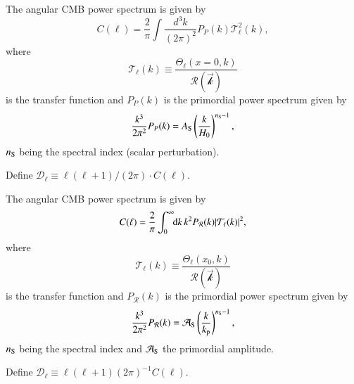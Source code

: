 

\please

The angular CMB power spectrum is given by
\begin{equation}
    C(\ell)= \frac{2}{\pi} \int \frac{d^3 k}{(2\pi)^2} P_P(k) \mathcal{T}_\ell^2 (k),
\end{equation}
where
\begin{equation}
    \mathcal{T}_\ell(k) \equiv \frac{\Theta_\ell(x\!=\!0, k)}{\mathcal{R(\vec{k})}}
\end{equation}
is the transfer function and $P_P(k)$ is the primordial power spectrum given by
\begin{equation}
    \frac{k^3}{2\pi^2} P_P (k) = A_\mathrm{S}\left( \frac{k}{H_0}\right)^{n_\mathrm{S}-1},
\end{equation}
$n_\mathrm{S}$ being the spectral index (scalar perturbation).


Define $\mathcal{D}_\ell \equiv \ell (\ell+1)/(2\pi) \cdot C(\ell) $.

\sendhelp

\please

The angular CMB power spectrum is given by
\begin{equation}
    C(\ell)= \frac{2}{\pi} \int_0^\infty \!\!\mathop{}\!\mathrm{d} {k}\, k^2 P_\mathcal{R}(k) \abs{\mathcal{T}_\ell (k)}^2,
\end{equation}
where
\begin{equation}
    \mathcal{T}_\ell(k) \equiv \frac{\Theta_\ell(x_0, k)}{\mathcal{R(\vec{k})}}
\end{equation}
is the transfer function and $P_\mathcal{R}(k)$ is the primordial power spectrum given by
\begin{equation}
    \frac{k^3}{2\pi^2} P_\mathcal{R} (k) = \mathcal{A}_\mathrm{S}\left( \frac{k}{k_\mathrm{p}}\right)^{n_\mathrm{S}-1},
\end{equation}
$n_\mathrm{S}$ being the spectral index and $\mathcal{A}_\mathrm{S}$ the primordial amplitude.


Define $\mathcal{D}_\ell \equiv \ell (\ell+1)(2\pi)^{-1} C(\ell) $.




\sendhelp



